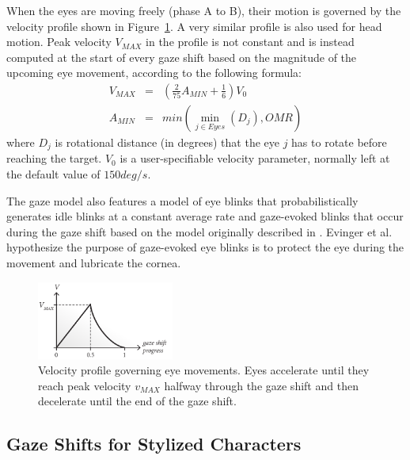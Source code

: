 When the eyes are moving freely (phase A to B), their motion is governed by the velocity profile shown in Figure~\ref{fig:VelocityProfile}. A very similar profile is also used for head motion. Peak velocity $V_{MAX}$ in the profile is not constant and is instead computed at the start of every gaze shift based on the magnitude of the upcoming eye movement, according to the following formula:
\begin{eqnarray} \label{eq:AndristVmax}
V_{MAX} &=& (\frac{2}{75} A_{MIN} + \frac{1}{6})V_0 \\
A_{MIN} &=& min( \mathop{min}_{j \in Eyes}(D_j), OMR ) \nonumber
\end{eqnarray}
where $D_j$ is rotational distance (in degrees) that the eye $j$ has to rotate before reaching the target. $V_0$ is a user-specifiable velocity parameter, normally left at the default value of $150 deg/s$.

The gaze model also features a model of eye blinks that probabilistically generates idle blinks at a constant average rate and gaze-evoked blinks that occur during the gaze shift based on the model originally described in \cite{peters2010animating}. Evinger et al. \cite{evinger1994lookleap} hypothesize the purpose of gaze-evoked eye blinks is to protect the eye during the movement and lubricate the cornea.

\begin{figure}[!b]
\centering
\vspace{-6pt}
\includegraphics[width=0.40\textwidth]{Figures/VelocityProfile.pdf}
\caption{Velocity profile governing eye movements. Eyes accelerate until they reach peak velocity $v_{MAX}$ halfway through the gaze shift and then decelerate until the end of the gaze shift.}
\vspace{-10pt}
\label{fig:VelocityProfile}
\end{figure}

\subsection{Gaze Shifts for Stylized Characters}

